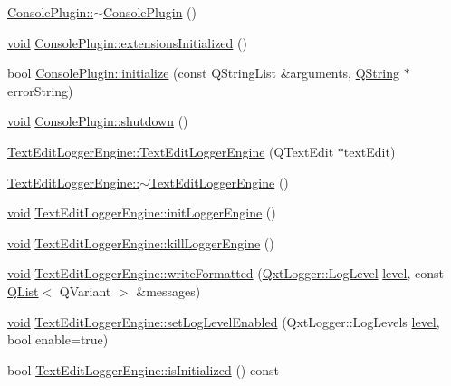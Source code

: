 \begin{DoxyCompactItemize}
\hyperlink{group___console_plugin_ga052ccde553f4cd9ef381d5035141b863}{Console\-Plugin\-::$\sim$\-Console\-Plugin} ()
\item 
\hyperlink{group___u_a_v_objects_plugin_ga444cf2ff3f0ecbe028adce838d373f5c}{void} \hyperlink{group___console_plugin_ga85a6a6c06db877c20f7a07d780d8b475}{Console\-Plugin\-::extensions\-Initialized} ()
\item 
bool \hyperlink{group___console_plugin_ga16272a47e2f07a68477d2c8c949dd1a7}{Console\-Plugin\-::initialize} (const Q\-String\-List \&arguments, \hyperlink{group___u_a_v_objects_plugin_gab9d252f49c333c94a72f97ce3105a32d}{Q\-String} $\ast$error\-String)
\item 
\hyperlink{group___u_a_v_objects_plugin_ga444cf2ff3f0ecbe028adce838d373f5c}{void} \hyperlink{group___console_plugin_gaa3ff74c08dc36f2a1ba79357ab45319a}{Console\-Plugin\-::shutdown} ()
\item 
\hyperlink{group___console_plugin_gaf57b0c5ea1591a2931695b3e58c8d298}{Text\-Edit\-Logger\-Engine\-::\-Text\-Edit\-Logger\-Engine} (Q\-Text\-Edit $\ast$text\-Edit)
\item 
\hyperlink{group___console_plugin_gaf9f579c5f0cbb1b08f7fcd3bd30f8964}{Text\-Edit\-Logger\-Engine\-::$\sim$\-Text\-Edit\-Logger\-Engine} ()
\item 
\hyperlink{group___u_a_v_objects_plugin_ga444cf2ff3f0ecbe028adce838d373f5c}{void} \hyperlink{group___console_plugin_gad4e7c7170672faefa715053b281859c2}{Text\-Edit\-Logger\-Engine\-::init\-Logger\-Engine} ()
\item 
\hyperlink{group___u_a_v_objects_plugin_ga444cf2ff3f0ecbe028adce838d373f5c}{void} \hyperlink{group___console_plugin_ga54411c88e44357048e786fb83d2abb21}{Text\-Edit\-Logger\-Engine\-::kill\-Logger\-Engine} ()
\item 
\hyperlink{group___u_a_v_objects_plugin_ga444cf2ff3f0ecbe028adce838d373f5c}{void} \hyperlink{group___console_plugin_ga2a9c1df4120a7ceeb25bafac4682e695}{Text\-Edit\-Logger\-Engine\-::write\-Formatted} (\hyperlink{class_qxt_logger_ac2071072628aa786466124cc32a324e7}{Qxt\-Logger\-::\-Log\-Level} \hyperlink{glext_8h_abc60a79088789bd61297bf5f9ff500d1}{level}, const \hyperlink{class_q_list}{Q\-List}$<$ Q\-Variant $>$ \&messages)
\item 
\hyperlink{group___u_a_v_objects_plugin_ga444cf2ff3f0ecbe028adce838d373f5c}{void} \hyperlink{group___console_plugin_ga45c5e0aeca53547cd9b538c3cd428689}{Text\-Edit\-Logger\-Engine\-::set\-Log\-Level\-Enabled} (Qxt\-Logger\-::\-Log\-Levels \hyperlink{glext_8h_abc60a79088789bd61297bf5f9ff500d1}{level}, bool enable=true)
\item 
bool \hyperlink{group___console_plugin_gaaf31edb9cfde3ba4fca139b77f04c0a5}{Text\-Edit\-Logger\-Engine\-::is\-Initialized} () const 
\end{DoxyCompactItemize}


